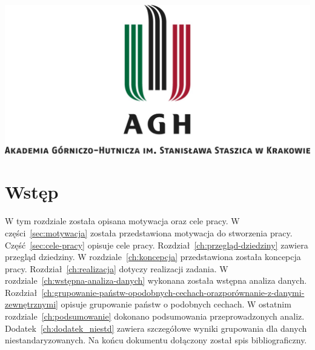 \documentclass[11pt]{report}
\begin{document}
    \begin{titlepage}
        \centering
        \includegraphics[width=\linewidth]{fig/AGH.jpg}
        \vspace{0.03\textheight}
        \bigskip
        \vspace{0.2\textheight}
        \par

        \vspace{0.1\textheight}
    \end{titlepage}

    \tableofcontents


    \chapter{Wstęp}

    W tym rozdziale została opisana motywacja oraz cele pracy.
    W części~\ref{sec:motywacja} została przedstawiona motywacja do stworzenia pracy.
    Część~\ref{sec:cele-pracy} opisuje cele pracy.
    Rozdział~\ref{ch:przegląd-dziedziny} zawiera przegląd dziedziny.
    W rozdziale~\ref{ch:koncepcja} przedstawiona została koncepcja pracy.
    Rozdział~\ref{ch:realizacja} dotyczy realizacji zadania.
    W rozdziale~\ref{ch:wstępna-analiza-danych} wykonana została wstępna analiza danych.
    Rozdział~\ref{ch:grupowanie-państw-opodobnych-cechach-orazporównanie-z-danymi-zewnętrznymi} opisuje grupowanie państw o podobnych cechach.
    W ostatnim rozdziale~\ref{ch:podsumowanie} dokonano podsumowania przeprowadzonych analiz.
    Dodatek~\ref{ch:dodatek_niestd} zawiera szczegółowe wyniki grupowania dla danych niestandaryzowanych.
    Na końcu dokumentu dołączony został spis bibliograficzny.
\end{document}
